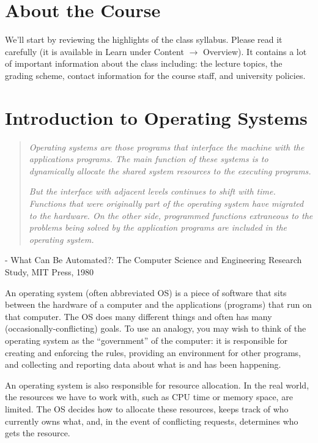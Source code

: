 




\section*{About the Course}
We'll start by reviewing the highlights of the class syllabus. Please read it carefully (it is available in Learn under Content $\rightarrow$ Overview). It contains a lot of important information about the class including: the lecture topics, the grading scheme, contact information for the course staff, and university policies.

\section*{Introduction to Operating Systems}


\begin{quote}
\textit{Operating systems are those programs that interface the machine with the applications programs. The main function of these systems is to dynamically allocate the shared system resources to the executing programs.}

\textit{But the interface with adjacent levels continues to shift with
time. Functions that were originally part of the operating system have migrated to the hardware. On the other side, programmed functions extraneous to the problems being solved by the application programs are included in the operating system.
}
\end{quote}

\hfill - What Can Be Automated?: The Computer Science and Engineering Research Study, MIT Press, 1980

An operating system (often abbreviated OS) is a piece of software that sits between the hardware of a computer and the applications (programs) that run on that computer. The OS does many different things and often has many (occasionally-conflicting) goals. To use an analogy, you may wish to think of the operating system as the ``government'' of the computer: it is responsible for creating and enforcing the rules, providing an environment for other programs, and collecting and reporting data about what is and has been happening.

An operating system is also responsible for resource allocation. In the real world, the resources we have to work with, such as CPU time or memory space, are limited. The OS decides how to allocate these resources, keeps track of who currently owns what, and, in the event of conflicting requests, determines who gets the resource.

